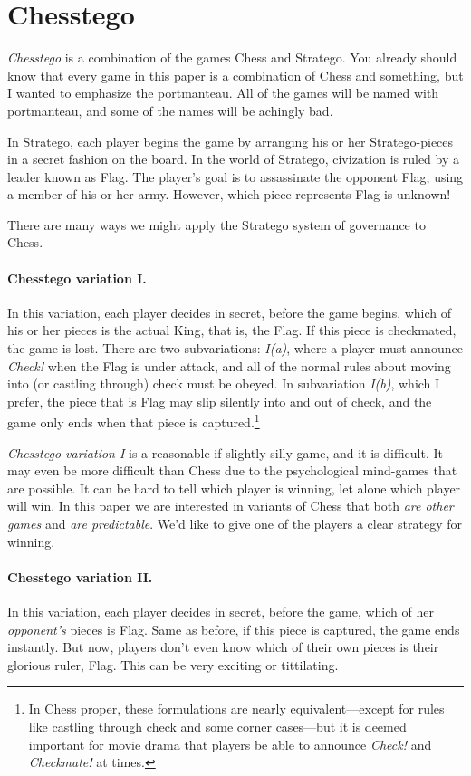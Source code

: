 \documentclass[twocolumn]{article}
\begin{document}
\section{Chesstego}

{\em Chesstego} is a combination of the games Chess and Stratego. You
already should know that every game in this paper is a combination of
Chess and something, but I wanted to emphasize the portmanteau. All of
the games will be named with portmanteau, and some of the names will
be achingly bad.

In Stratego, each player begins the game by arranging his or her
Stratego-pieces in a secret fashion on the board. In the world of
Stratego, civization is ruled by a leader known as Flag. The player's
goal is to assassinate the opponent Flag, using a member of his or her
army. However, which piece represents Flag is unknown!

There are many ways we might apply the Stratego system of governance
to Chess.

\paragraph{Chesstego variation I.} In this variation, each player decides
in secret, before the game begins, which of his or her pieces is the
actual King, that is, the Flag. If this piece is checkmated, the game
is lost. There are two subvariations: {\em I(a)}, where a player must
announce {\em Check!} when the Flag is under attack, and all of the
normal rules about moving into (or castling through) check must be
obeyed. In subvariation {\em I(b)}, which I prefer, the piece that is
Flag may slip silently into and out of check, and the game only ends
when that piece is captured.\footnote{In Chess proper, these
  formulations are nearly equivalent---except for rules like castling
  through check and some corner cases---but it is deemed important for
  movie drama that players be able to announce {\em Check!} and {\em
    Checkmate!} at times.}

{\em Chesstego variation I} is a reasonable if slightly silly game,
and it is difficult. It may even be more difficult than Chess due to the
psychological mind-games that are possible. It can be hard to tell which
player is winning, let alone which player will win. In this paper we
are interested in variants of Chess that both {\em are other games} and
{\em are predictable}. We'd like to give one of the players a clear
strategy for winning.

\paragraph{Chesstego variation II.} In this variation, each player
decides in secret, before the game, which of her {\em opponent's} pieces
is Flag. Same as before, if this piece is captured, the game ends
instantly. But now, players don't even know which of their own pieces
is their glorious ruler, Flag. This can be very exciting or tittilating.
\end{document}
